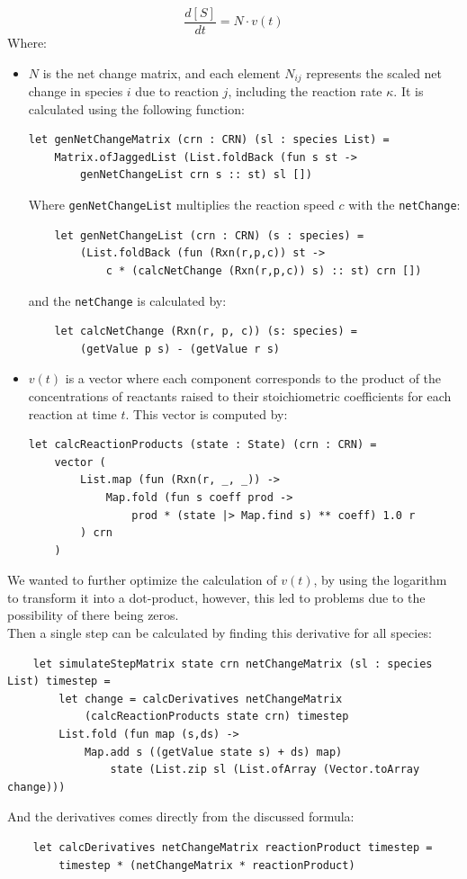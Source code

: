 \[
\frac{d[S]}{dt} = N \cdot v(t)
\]
Where:
\begin{itemize}
    \item \( N \) is the net change matrix, and each element \( N_{ij} \) represents the scaled net change in species \( i \) due to reaction \( j \), including the reaction rate \( \kappa \). It is calculated using the following function:
\begin{verbatim}
let genNetChangeMatrix (crn : CRN) (sl : species List) = 
    Matrix.ofJaggedList (List.foldBack (fun s st -> 
        genNetChangeList crn s :: st) sl [])
\end{verbatim}
Where \texttt{genNetChangeList} multiplies the reaction speed $c$ with the \texttt{netChange}:
\begin{verbatim}
    let genNetChangeList (crn : CRN) (s : species) = 
        (List.foldBack (fun (Rxn(r,p,c)) st -> 
            c * (calcNetChange (Rxn(r,p,c)) s) :: st) crn [])
\end{verbatim}
and the \texttt{netChange} is calculated by:
\begin{verbatim}
    let calcNetChange (Rxn(r, p, c)) (s: species) = 
        (getValue p s) - (getValue r s) 

\end{verbatim}

    \item \( v(t) \) is a vector where each component corresponds to the product of the concentrations of reactants raised to their stoichiometric coefficients for each reaction at time \( t \). This vector is computed by:
\begin{verbatim}
let calcReactionProducts (state : State) (crn : CRN) = 
    vector (
        List.map (fun (Rxn(r, _, _)) ->
            Map.fold (fun s coeff prod -> 
                prod * (state |> Map.find s) ** coeff) 1.0 r
        ) crn
    )
\end{verbatim}
\end{itemize}

We wanted to further optimize the calculation of \(v(t)\), by using the logarithm to transform it into a dot-product, however, this led to problems due to the possibility of there being zeros.\\

Then a single step can be calculated by finding this derivative for all species:
\begin{verbatim}
    let simulateStepMatrix state crn netChangeMatrix (sl : species List) timestep = 
        let change = calcDerivatives netChangeMatrix 
            (calcReactionProducts state crn) timestep
        List.fold (fun map (s,ds) -> 
            Map.add s ((getValue state s) + ds) map) 
                state (List.zip sl (List.ofArray (Vector.toArray change)))
\end{verbatim}
And the derivatives comes directly from the discussed formula:
\begin{verbatim}
    let calcDerivatives netChangeMatrix reactionProduct timestep =
        timestep * (netChangeMatrix * reactionProduct) 
\end{verbatim}

